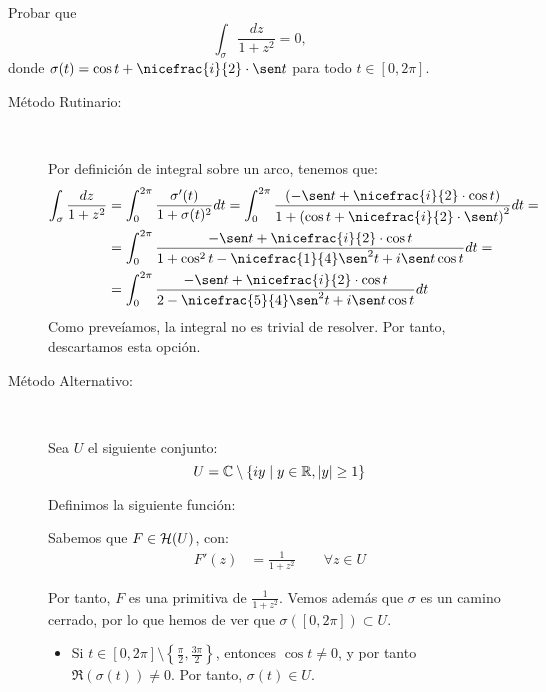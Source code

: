 \begin{ejercicio}
    Probar que
    \[
        \int_{\sigma} \frac{dz}{1+z^2} = 0,
    \]
    donde $\sigma(t) = \cos t + \nicefrac{i}{2}\cdot \sen t$ para todo $t \in [0,2\pi]$.
    \begin{description}
        \item[Método Rutinario:]~
        
        Por definición de integral sobre un arco, tenemos que:
        \begin{align*}
            \int_{\sigma} \frac{dz}{1+z^2} &= \int_{0}^{2\pi} \frac{\sigma'(t)}{1+\sigma(t)^2}dt
            = \int_{0}^{2\pi} \frac{\left(-\sen t + \nicefrac{i}{2}\cdot \cos t\right)}{1+\left(\cos t + \nicefrac{i}{2}\cdot \sen t\right)^2}dt
            =\\&= \int_{0}^{2\pi} \frac{-\sen t + \nicefrac{i}{2}\cdot \cos t}{1+\cos^2t -\nicefrac{1}{4}\sen^2t+i\sen t\cos t}dt
            =\\&= \int_{0}^{2\pi} \frac{-\sen t + \nicefrac{i}{2}\cdot \cos t}{2-\nicefrac{5}{4}\sen^2t+i\sen t\cos t}dt
        \end{align*}
        Como preveíamos, la integral no es trivial de resolver. Por tanto, descartamos esta opción.

        \item[Método Alternativo:]~
        
        Sea $U$ el siguiente conjunto:
        \begin{equation*}
            U=\mathbb{C}\setminus \{iy\mid y \in \mathbb{R},|y|\geq 1\}
        \end{equation*}

        Definimos la siguiente función:

        Sabemos que $F\in \mathcal{H}(U)$, con:
        \begin{align*}
            F'(z) &= \frac{1}{1+z^2}\qquad \forall z \in U
        \end{align*}

        Por tanto, $F$ es una primitiva de $\frac{1}{1+z^2}$. Vemos además que $\sigma$ es un camino cerrado, por lo que hemos de ver que $\sigma\left([0,2\pi]\right) \subset U$.
        \begin{itemize}
            \item Si $t \in [0,2\pi]\setminus \left\{\frac{\pi}{2},\frac{3\pi}{2}\right\}$, entonces $\cos t\neq 0$, y por tanto $\Re(\sigma(t))\neq 0$. Por tanto, $\sigma(t) \in U$.
            

\end{itemize}
\end{description}
\end{ejercicio}
